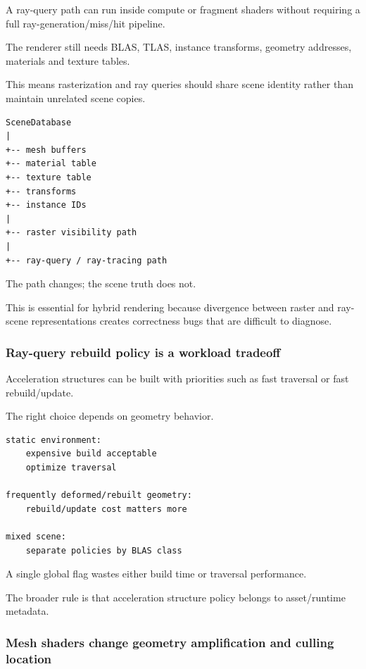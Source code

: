 A ray-query path can run inside compute or fragment shaders without requiring a full ray-generation/miss/hit pipeline.

The renderer still needs BLAS, TLAS, instance transforms, geometry addresses, materials and texture tables.

This means rasterization and ray queries should share scene identity rather than maintain unrelated scene copies.

\begin{verbatim}
SceneDatabase
|
+-- mesh buffers
+-- material table
+-- texture table
+-- transforms
+-- instance IDs
|
+-- raster visibility path
|
+-- ray-query / ray-tracing path
\end{verbatim}

The path changes; the scene truth does not.

This is essential for hybrid rendering because divergence between raster and ray-scene representations creates correctness bugs that are difficult to diagnose.

\subsubsection{Ray-query rebuild policy is a workload tradeoff}\label{05-engine-i-ch023-ray-query-rebuild-policy-is-a-workload-tradeoff}

Acceleration structures can be built with priorities such as fast traversal or fast rebuild/update.

The right choice depends on geometry behavior.

\begin{verbatim}
static environment:
    expensive build acceptable
    optimize traversal

frequently deformed/rebuilt geometry:
    rebuild/update cost matters more

mixed scene:
    separate policies by BLAS class
\end{verbatim}

A single global flag wastes either build time or traversal performance.

The broader rule is that acceleration structure policy belongs to asset/runtime metadata.

\subsubsection{Mesh shaders change geometry amplification and culling location}\label{05-engine-i-ch023-mesh-shaders-change-geometry-amplification-and-culling-location}

